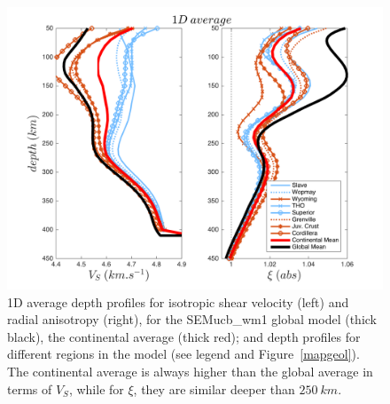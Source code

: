 \documentclass[12pt]{article}
\begin{document}
	\begin{figure}
		\centering
		\includegraphics[width=1\textwidth]{figures/1D_profile_with_regions.png}

		\caption{\baselineskip 18pt 
		1D average depth profiles for isotropic shear velocity (left) and radial anisotropy (right), for the SEMucb\_wm1 global model (thick black), the continental average (thick red); and depth profiles for different regions in the model (see legend and Figure~\ref{mapgeol}). The continental average is always higher than the global average in terms of $V_S$, while for $\xi$, they are similar deeper than $250 \: km$.}
		\label{1daverage}
	\end{figure}
\end{document}
